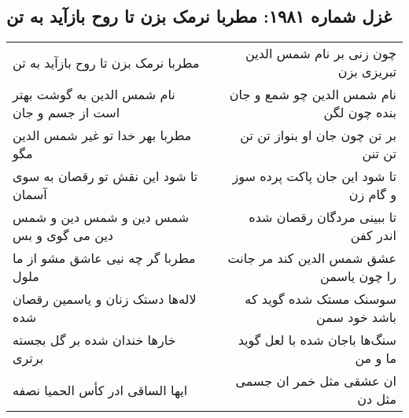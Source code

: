 \begin{center}
\section*{غزل شماره ۱۹۸۱: مطربا نرمک بزن تا روح بازآید به تن}
\label{sec:1981}
\begin{longtable}{l p{0.5cm} r}
مطربا نرمک بزن تا روح بازآید به تن
&&
چون زنی بر نام شمس الدین تبریزی بزن
\\
نام شمس الدین به گوشت بهتر است از جسم و جان
&&
نام شمس الدین چو شمع و جان بنده چون لگن
\\
مطربا بهر خدا تو غیر شمس الدین مگو
&&
بر تن چون جان او بنواز تن تن تن تنن
\\
تا شود این نقش تو رقصان به سوی آسمان
&&
تا شود این جان پاکت پرده سوز و گام زن
\\
شمس دین و شمس دین و شمس دین می گوی و بس
&&
تا ببینی مردگان رقصان شده اندر کفن
\\
مطربا گر چه نیی عاشق مشو از ما ملول
&&
عشق شمس الدین کند مر جانت را چون یاسمن
\\
لاله‌ها دستک زنان و یاسمین رقصان شده
&&
سوسنک مستک شده گوید که باشد خود سمن
\\
خارها خندان شده بر گل بجسته برتری
&&
سنگ‌ها باجان شده با لعل گوید ما و من
\\
ایها الساقی ادر کأس الحمیا نصفه
&&
ان عشقی مثل خمر ان جسمی مثل دن
\\
\end{longtable}
\end{center}

